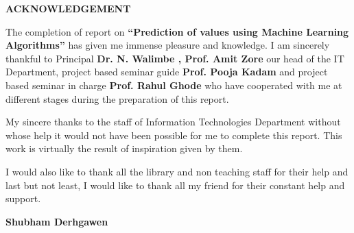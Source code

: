 \documentclass[12pt,times,a4paper]{report}
\renewcommand{\baselinestretch}{1.5}
\begin{document}
\newpage
\begin{center}
\thispagestyle{empty}
\renewcommand{\baselinestretch}{1.5}
{\fontsize{12}{10} \bf ACKNOWLEDGEMENT}\\
\begin{enumerate}
\vspace{0.4in}
The completion of report on \textbf{“Prediction of values using Machine Learning Algorithms”} has given me immense pleasure and knowledge. I am sincerely thankful to Principal \textbf{Dr. N. Walimbe , Prof. Amit Zore} our head of the IT Department, project based seminar guide \textbf{Prof. Pooja Kadam } and project based seminar in charge \textbf{Prof. Rahul Ghode} who have cooperated with me at different stages during the preparation of this report.

My sincere thanks to the staff of Information Technologies Department without whose help it
would not have been possible for me to complete this report. This work is virtually the result of
inspiration given by them.

I would also like to thank all the library and non teaching staff for their help and last but not
least, I would like to thank all my friend for their constant help and support.

\end{enumerate}
\end{center}
\vspace*{0.8in}
{\bf Shubham Derhgawen}\\


\newpage


\newpage






\end{document}
